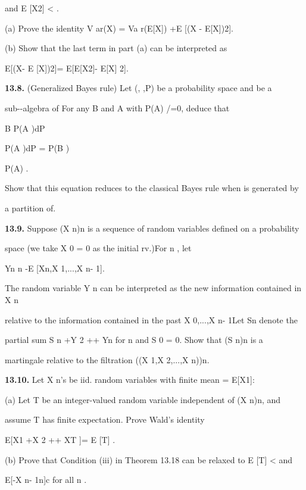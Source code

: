 and E [X2] < \infty .

(a) Prove the identity V ar(X) = Va r(E[X\vertY]) +E [(X - E[X\vertY])2].

(b) Show that the last term in part (a) can be interpreted as

E[(X- E [X\vertY])2]= E[E[X2\vertY]- E[X\vertY] 2].

\textbf{13.8.} (Generalized Bayes rule) Let (\Omega, ,P) be a probability space and  be a

sub-\sigma-algebra of  For any B \in {}and A \in {}with P(A) /=0, deduce that

\int

B P(A \vert{})dP\int

\Omega P(A \vert{})dP = P(B \capA)

P(A) .

Show that this equation reduces to the classical Bayes rule when is generated by

a partition of\Omega .

\textbf{13.9.} Suppose (X n)n is a sequence of random variables defined on a probability

space (we take X 0 = 0 as the initial rv.)For n , let

Yn \coloneqqX n -E [Xn,X 1,...,X n- 1].

The random variable Y n can be interpreted as the new information contained in X n

relative to the information contained in the past X 0,...,X n- 1Let Sn denote the

partial sum S n  +Y 2 +\cdot\cdot\cdot+ Yn for n  and S 0 = 0. Show that (S n)n is a

martingale relative to the filtration (\sigma(X 1,X 2,...,X n))n.

\textbf{13.10.} Let X n's be iid. random variables with finite mean \mu = E[X1]:

(a) Let T be an integer-valued random variable independent of (X n)n, and

assume T has finite expectation. Prove Wald's identity

E[X1 +X 2 +\cdot\cdot\cdot+ XT ]= \mu\cdot E [T] .

(b) Prove that Condition (iii) in Theorem 13.18 can be relaxed to E [T] < \infty and

E[\vertXn -X n- 1\vert\vert {}n]\leq c for all n .

